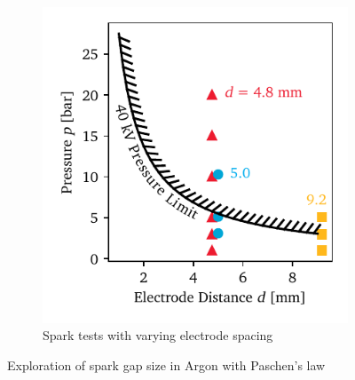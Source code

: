 \begin{figure}[h]
\begin{subfigure}[t]{0.47\textwidth}
                    \centering
                    \includegraphics[width=\textwidth]{assets/3 design/sparkTests_final.pdf}
                    \caption{Spark tests with varying electrode spacing}
                    \label{fig:sparkTests}
                \end{subfigure}
                \caption{Exploration of spark gap size in Argon with Paschen's law}
                \label{fig:sparking}
            \end{figure}

